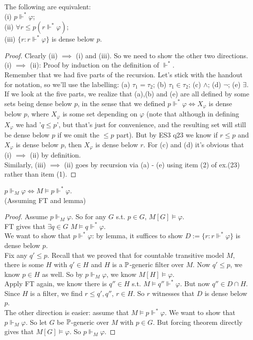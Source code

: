 \documentclass[a4paper]{article}
\begin{document}
\begin{lemma}
The following are equivalent:\\
(i) $p \Vdash^* \varphi$;\\
(ii) $\forall r \leq p (r \Vdash^* \varphi)$;\\
(iii) $\{r: r \Vdash^* \varphi\}$ is dense below $p$.
\begin{proof}
Clearly (ii) $\implies$ (i) and (iii). So we need to show the other two directions.\\
(i) $\implies$ (ii): Proof by induction on the definition of $\Vdash^*$.\\
Remember that we had five parts of the recursion. Let's stick with the handout for notation, so we'll use the labelling: (a) $\tau_1=\tau_2$; (b) $\tau_1 \in \tau_2$; (c) $\wedge$; (d) $\neg$; (e) $\exists$.\\
If we look at the five parts, we realize that (a),(b) and (e) are all defined by some sets being dense below $p$, in the sense that we defined $p \Vdash^* \varphi \iff X_\varphi$ is dense below $p$, where $X_\varphi$ is some set depending on $\varphi$ (note that although in defining $X_\varphi$ we had '$q \leq p$', but that's just for convenience, and the resulting set will still be dense below $p$ if we omit the $\leq p$ part). But by ES3 q23 we know if $r \leq p$ and $X_\varphi$ is dense below $p$, then $X_\varphi$ is dense below $r$. For (c) and (d) it's obvious that (i) $\implies$ (ii) by definition.\\
Similarly, (iii) $\implies$ (ii) goes by recursion via (a) - (e) using item (2) of ex.(23) rather than item (1).
\end{proof}
\end{lemma}

\begin{coro}
$p \Vdash_M \varphi \iff M \vDash p \Vdash^* \varphi$.\\
(Assuming FT and lemma)
\begin{proof}
Assume $p \Vdash_M \varphi$. So for any $G$ s.t. $p \in G$, $M[G] \vDash \varphi$.\\
FT gives that $\exists q \in G$ $M \vDash q \Vdash^* \varphi$.\\
We want to show that $p \Vdash^* \varphi$: by lemma, it suffices to show $D:=\{r:r \Vdash^* \varphi\}$ is dense below $p$.\\
Fix any $q' \leq p$. Recall that we proved that for countable transitive model $M$, there is some $H$ with $q' \in H$ and $H$ is a $\P$-generic filter over $M$. Now $q' \leq p$, we know $p \in H$ as well. So by $p \Vdash_M \varphi$, we know $M[H] \vDash \varphi$.\\
Apply FT again, we know there is $q'' \in H$ s.t. $M \vDash q'' \Vdash^* \varphi$. But now $q'' \in D \cap H$. Since $H$ is a filter, we find $r \leq q',q''$, $r \in H$. So $r$ witnesses that $D$ is dense below $p$.\\
The other direction is easier: assume that $M \vDash p \Vdash^* \varphi$. We want to show that $p \Vdash_M \varphi$. So let $G$ be $\P$-generic over $M$ with $p \in G$. But forcing theorem directly gives that $M[G] \vDash \varphi$. So $p \Vdash_M \varphi$.
\end{proof}
\end{coro}
\end{document}
